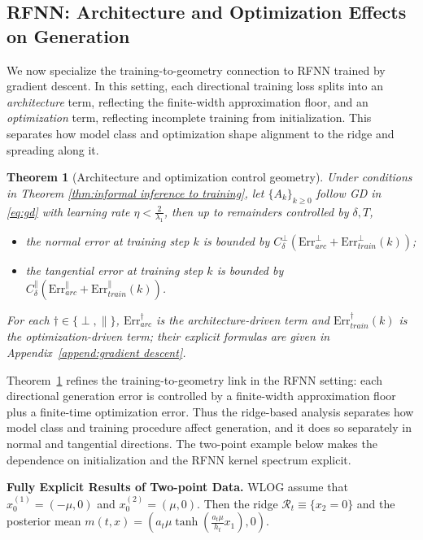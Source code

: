 \documentclass[11pt]{article}
\newcommand{\mc}{\mathcal}
\newcommand{\Err}{\mathrm{Err}}
\newtheorem{theorem}{Theorem}[section]
\begin{document}
\subsection{RFNN: Architecture and Optimization Effects on Generation}
\label{subsec:RF+GD}
We now specialize the training-to-geometry connection to RFNN trained by gradient descent. In this setting, each directional training loss splits into an \emph{architecture} term, reflecting the finite-width approximation floor, and an \emph{optimization} term, reflecting incomplete training from initialization. This separates how model class and optimization shape alignment to the ridge and spreading along it.
\begin{theorem}[Architecture and optimization control geometry]\label{thm:directional decomposition}
Under conditions in Theorem \ref{thm:informal inference to training}, let $\{A_k\}_{k\ge 0}$ follow GD in \eqref{eq:gd} with learning rate $\eta<\tfrac{2}{\lambda_1}$, then up to remainders controlled by $\delta,T$,
\begin{itemize}
    \item the normal error at training step $k$ is bounded by $C_\delta^\perp(\Err_{arc}^\perp+\Err_{train}^\perp(k))$;
    \item the tangential error at training step $k$ is bounded by $C_\delta^\parallel(\Err_{arc}^\parallel+\Err_{train}^\parallel(k))$.
\end{itemize}
For each $\dagger \in \{\perp,\parallel \}$, $\Err_{arc}^\dagger$ is the architecture-driven term and $\Err_{train}^\dagger(k)$ is the optimization-driven term; their explicit formulas are given in Appendix~\ref{append:gradient descent}.
\end{theorem}
Theorem~\ref{thm:directional decomposition} refines the training-to-geometry link in the RFNN setting: each directional generation error is controlled by a finite-width approximation floor plus a finite-time optimization error. Thus the ridge-based analysis separates how model class and training procedure affect generation, and it does so separately in normal and tangential directions. The two-point example below makes the dependence on initialization and the RFNN kernel spectrum explicit.

\noindent\textbf{Fully Explicit Results of Two-point Data.} WLOG assume that $x_0^{(1)}=(- \mu ,0)$ and $x_0^{(2)}=(\mu,0)$. Then the ridge $\mc{R}_t \equiv \{x_2=0\}$ and the posterior mean $m(t,x)=( a_t\mu \tanh ( \tfrac{a_t\mu}{h_t}x_1 ), 0 )$. 
\end{document}
